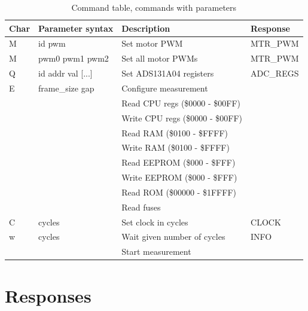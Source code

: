 \documentclass{article}
\begin{document}
\begin{table}[H]
\begin{centering}
\begin{tabular}{|p{0.8cm}|p{2.6cm}|p{4.9cm}|p{2.0cm}|}
\hline
{\bf Char} & {\bf Parameter syntax} & {\bf Description} & {\bf Response} \\ \hline
M & id pwm              & Set motor PWM                       & MTR\_PWM      \\ \hline
M & pwm0 pwm1 pwm2      & Set all motor PWMs                  & MTR\_PWM      \\ \hline
Q & id addr val [...]   & Set ADS131A04 registers             & ADC\_REGS     \\ \hline
E & frame\_size gap     & Configure measurement               &               \\ \hline
  &                     & Read CPU regs (\$0000 - \$00FF)     &               \\ \hline
  &                     & Write CPU regs (\$0000 - \$00FF)    &               \\ \hline
  &                     & Read RAM (\$0100 - \$FFFF)          &               \\ \hline
  &                     & Write RAM (\$0100 - \$FFFF)         &               \\ \hline
  &                     & Read EEPROM (\$000 - \$FFF)         &               \\ \hline
  &                     & Write EEPROM (\$000 - \$FFF)        &               \\ \hline
  &                     & Read ROM (\$00000 - \$1FFFF)        &               \\ \hline
  &                     & Read fuses                          &               \\ \hline
C & cycles              & Set clock in cycles                 & CLOCK         \\ \hline
w & cycles              & Wait given number of cycles         & INFO          \\ \hline
  &                     & Start measurement                   &               \\ \hline
\end{tabular}
\caption{Command table, commands with parameters}
\label{command_table}
\end{centering}
\end{table}

\section{Responses}
\end{document}
